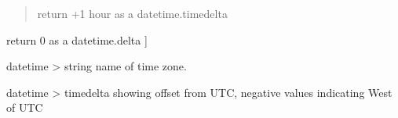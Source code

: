 \documentclass[letterpaper,10pt,english]{sphinxmanual}
\begin{document}
\begin{fulllineitems}
\begin{fulllineitems}
\begin{description}
\begin{quote}
\sphinxAtStartPar
return +1 hour as a datetime.timedelta
\end{quote}
\begin{description}
\sphinxAtStartPar
return 0 as a datetime.delta {]}

\end{description}

\end{description}

\end{fulllineitems}


\begin{fulllineitems}
\label{\detokenize{api/killMS.Data:killMS.Data.sidereal.USTimeZone.tzname}}
\pysigstartsignatures
{}
\pysigstopsignatures
\sphinxAtStartPar
datetime \sphinxhyphen{}\textgreater{} string name of time zone.

\end{fulllineitems}


\begin{fulllineitems}
\label{\detokenize{api/killMS.Data:killMS.Data.sidereal.USTimeZone.utcoffset}}
\pysigstartsignatures
{}
\pysigstopsignatures
\sphinxAtStartPar
datetime \sphinxhyphen{}\textgreater{} timedelta showing offset from UTC, negative values indicating West of UTC

\end{fulllineitems}


\end{fulllineitems}

\end{document}
